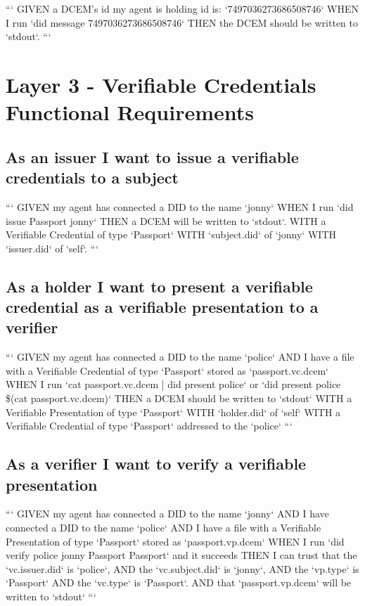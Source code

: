 ```
GIVEN a DCEM's id my agent is holding id is: `7497036273686508746`
WHEN  I run `did message 7497036273686508746`
THEN  the DCEM should be written to `stdout`.
```


\section{Layer 3 - Verifiable Credentials Functional Requirements}

\subsection{As an issuer I want to issue a verifiable credentials to a subject}

```
GIVEN my agent has connected a DID to the name `jonny`
WHEN  I run `did issue Passport jonny`
THEN  a DCEM will be written to `stdout`.
    WITH a Verifiable Credential of type `Passport`
    WITH `subject.did` of `jonny`
    WITH `issuer.did` of `self`.
```

\subsection{As a holder I want to present a verifiable credential as a verifiable presentation to a verifier}

```
GIVEN my agent has connected a DID to the name `police`
AND   I have a file with a Verifiable Credential of type `Passport` stored as `passport.vc.dcem`
WHEN  I run `cat passport.vc.dcem | did present police` or `did present police \$(cat passport.vc.dcem)`
THEN  a DCEM should be written to `stdout`
    WITH a Verifiable Presentation of type `Passport`
    WITH `holder.did` of `self`
    WITH a Verifiable Credential of type `Passport` addressed to the `police`
```

\subsection{As a verifier I want to verify a verifiable presentation}

```
GIVEN my agent has connected a DID to the name `jonny`
AND   I have connected a DID to the name `police`
AND   I have a file with a Verifiable Presentation of type `Passport` stored as `passport.vp.dcem`
WHEN  I run `did verify police jonny Passport Passport` and it succeeds
THEN  I can trust that the `vc.issuer.did` is `police`,
AND   the `vc.subject.did` is `jonny`,
AND   the `vp.type` is `Passport`
AND   the `vc.type` is `Passport`.
AND   that `passport.vp.dcem` will be written to `stdout`
```


